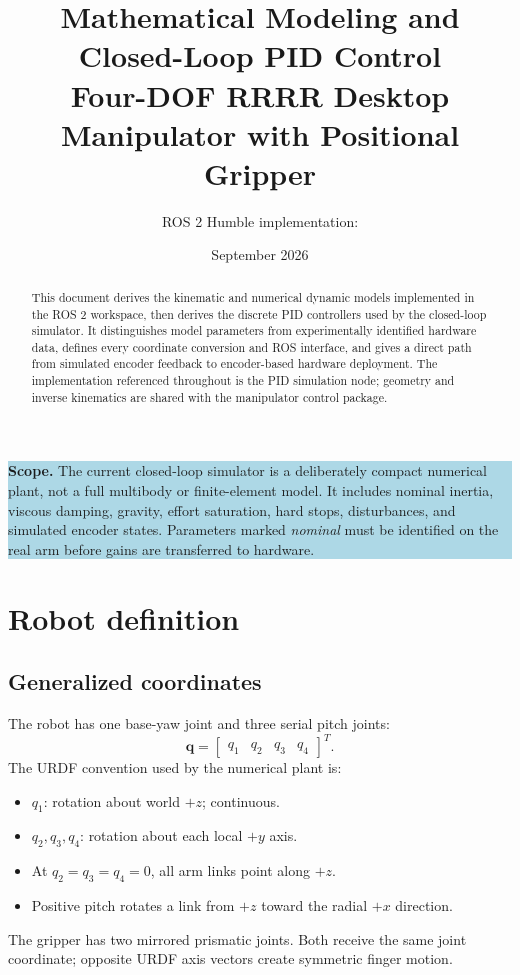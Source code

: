 \documentclass[11pt,a4paper]{article}
\title{\textbf{Mathematical Modeling and Closed-Loop PID Control}\\[3mm]
\large Four-DOF RRRR Desktop Manipulator with Positional Gripper}
\author{ROS 2 Humble implementation: \code{manipulator\_ws}}
\date{September 2026}
\newcommand{\vect}[1]{\bm{#1}}
\begin{document}
\maketitle
\begin{abstract}
This document derives the kinematic and numerical dynamic models implemented in
the ROS 2 workspace, then derives the discrete PID controllers used by the
closed-loop simulator. It distinguishes model parameters from experimentally
identified hardware data, defines every coordinate conversion and ROS interface,
and gives a direct path from simulated encoder feedback to encoder-based hardware
deployment. The implementation referenced throughout is the PID simulation
node; geometry and inverse kinematics are shared with the manipulator control
package.
\end{abstract}

\begin{center}
\colorbox{lightblue}{\parbox{0.93\textwidth}{\textbf{Scope.}
The current closed-loop simulator is a deliberately compact numerical plant,
not a full multibody or finite-element model. It includes nominal inertia,
viscous damping, gravity, effort saturation, hard stops, disturbances, and
simulated encoder states. Parameters marked \emph{nominal} must be identified
on the real arm before gains are transferred to hardware.}}
\end{center}

\tableofcontents
\newpage

\section{Robot definition}

\subsection{Generalized coordinates}
The robot has one base-yaw joint and three serial pitch joints:
\[
  \vect q=\begin{bmatrix}q_1&q_2&q_3&q_4\end{bmatrix}^{T}.
\]
The URDF convention used by the numerical plant is:
\begin{itemize}
  \item $q_1$: rotation about world $+z$; continuous.
  \item $q_2,q_3,q_4$: rotation about each local $+y$ axis.
  \item At $q_2=q_3=q_4=0$, all arm links point along $+z$.
  \item Positive pitch rotates a link from $+z$ toward the radial $+x$ direction.
\end{itemize}
The gripper has two mirrored prismatic joints. Both receive the same joint
coordinate; opposite URDF axis vectors create symmetric finger motion.
\end{document}
